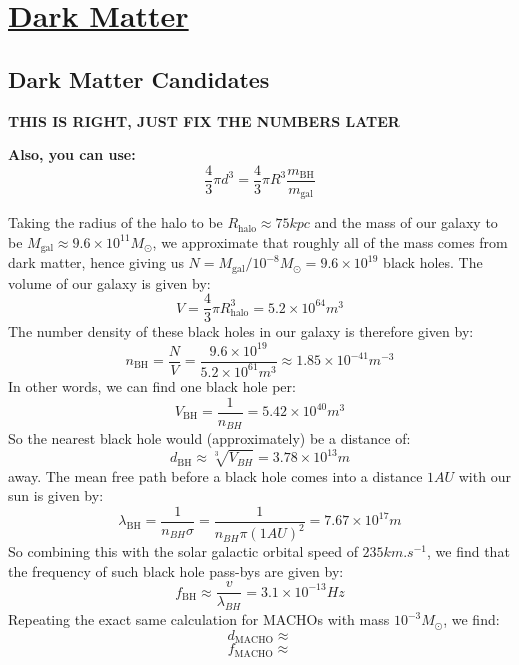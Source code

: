 \section[Dark Matter]{\hyperlink{toc}{Dark Matter}}

\subsection{Dark Matter Candidates}
\textbf{THIS IS RIGHT, JUST FIX THE NUMBERS LATER}

\textbf{Also, you can use:}
\begin{equation}
    \frac{4}{3}\pi d^3 = \frac{4}{3}\pi R^3 \frac{m_{\text{BH}}}{m_{\text{gal}}}
\end{equation}

Taking the radius of the halo to be $R_{\text{halo}} \approx 75 \si{kpc}$ and the mass of our galaxy to be $M_{\text{gal}} \approx 9.6 \times 10^{11} M_\odot$, we approximate that roughly all of the mass comes from dark matter, hence giving us $N = M_{\text{gal}}/10^{-8}M_\odot = 9.6 \times 10^{19}$ black holes. The volume of our galaxy is given by:
\begin{equation}
    V = \frac{4}{3}\pi R_{\text{halo}}^3 = 5.2 \times 10^{64}\si{m^3}
\end{equation}
The number density of these black holes in our galaxy is therefore given by:
\begin{equation}
    n_{\text{BH}} = \frac{N}{V} = \frac{9.6 \times 10^{19}}{5.2 \times 10^{61}\si{m^3}} \approx 1.85 \times 10^{-41} \si{m^{-3}}
\end{equation}
In other words, we can find one black hole per:
\begin{equation}
    V_{\text{BH}} = \frac{1}{n_{BH}} = 5.42 \times 10^{40}\si{m^3}
\end{equation}
So the nearest black hole would (approximately) be a distance of:
\begin{equation}
    \boxed{d_{\text{BH}} \approx \sqrt[3]{V_{BH}} = 3.78 \times 10^{13}\si{m}}
\end{equation}
away. The mean free path before a black hole comes into a distance $1 \si{AU}$ with our sun is given by:
\begin{equation}
    \lambda_{\text{BH}} = \frac{1}{n_{BH}\sigma} = \frac{1}{n_{BH}\pi (1 \si{AU})^2} = 7.67 \times 10^{17}\si{m}
\end{equation}
So combining this with the solar galactic orbital speed of $235 \si{km.s^{-1}}$, we find that the frequency of such black hole pass-bys are given by:
\begin{equation}
    \boxed{f_{\text{BH}} \approx \frac{v}{\lambda_{BH}} = 3.1 \times 10^{-13} \si{Hz}}
\end{equation}
Repeating the exact same calculation for MACHOs with mass $10^{-3}M_\odot$, we find:
\begin{equation}
    \boxed{d_{\text{MACHO}} \approx}
\end{equation}
\begin{equation}
    \boxed{f_{\text{MACHO}} \approx}
\end{equation}

